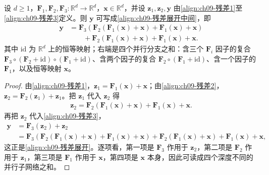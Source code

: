 \documentclass[../../main.tex]{subfiles}
\begin{document}
\begin{proposition}[残差网络的展开]\label{proposition:ch09-残差展开}
设 $d\geqslant1$，$\boldsymbol{F}_{1},\boldsymbol{F}_{2},\boldsymbol{F}_{3}:\mathbb{R}^{d}\to\mathbb{R}^{d}$，$\boldsymbol{x}\in\mathbb{R}^{d}$，并设 $\boldsymbol{z}_{1},\boldsymbol{z}_{2},\boldsymbol{y}$ 由\eqref{align:ch09-残差1}至\eqref{align:ch09-残差3}定义。则 $\boldsymbol{y}$ 可写成\eqref{align:ch09-残差展开中间}，即
\begin{align}
\boldsymbol{y}
&=\boldsymbol{F}_{3}\!\left(\boldsymbol{F}_{2}\!\left(\boldsymbol{F}_{1}(\boldsymbol{x})+\boldsymbol{x}\right)+\boldsymbol{F}_{1}(\boldsymbol{x})+\boldsymbol{x}\right)\nonumber\\
&\qquad+\boldsymbol{F}_{2}\!\left(\boldsymbol{F}_{1}(\boldsymbol{x})+\boldsymbol{x}\right)+\boldsymbol{F}_{1}(\boldsymbol{x})+\boldsymbol{x}.
\label{align:ch09-残差展开}
\end{align}
其中 $\mathrm{id}$ 为 $\mathbb{R}^{d}$ 上的恒等映射；右端是四个并行分支之和：含三个 $\boldsymbol{F}_{i}$ 因子的复合 $\boldsymbol{F}_{3}\circ(\boldsymbol{F}_{2}+\mathrm{id})\circ(\boldsymbol{F}_{1}+\mathrm{id})$、含两个因子的复合 $\boldsymbol{F}_{2}\circ(\boldsymbol{F}_{1}+\mathrm{id})$、含一个因子的 $\boldsymbol{F}_{1}$，以及恒等映射 $\boldsymbol{x}$。
\end{proposition}

\begin{proof}
由\eqref{align:ch09-残差1}，$\boldsymbol{z}_{1}=\boldsymbol{F}_{1}(\boldsymbol{x})+\boldsymbol{x}$；由\eqref{align:ch09-残差2}，$\boldsymbol{z}_{2}=\boldsymbol{F}_{2}(\boldsymbol{z}_{1})+\boldsymbol{z}_{1}$。把 $\boldsymbol{z}_{1}$ 代入 $\boldsymbol{z}_{2}$ 得
\begin{align*}
\boldsymbol{z}_{2}=\boldsymbol{F}_{2}\!\left(\boldsymbol{F}_{1}(\boldsymbol{x})+\boldsymbol{x}\right)+\boldsymbol{F}_{1}(\boldsymbol{x})+\boldsymbol{x}.
\end{align*}
再把 $\boldsymbol{z}_{2}$ 代入\eqref{align:ch09-残差3}，
\begin{align*}
\boldsymbol{y}&=\boldsymbol{F}_{3}(\boldsymbol{z}_{2})+\boldsymbol{z}_{2}\\
&=\boldsymbol{F}_{3}\!\left(\boldsymbol{F}_{2}\!\left(\boldsymbol{F}_{1}(\boldsymbol{x})+\boldsymbol{x}\right)+\boldsymbol{F}_{1}(\boldsymbol{x})+\boldsymbol{x}\right)+\boldsymbol{F}_{2}\!\left(\boldsymbol{F}_{1}(\boldsymbol{x})+\boldsymbol{x}\right)+\boldsymbol{F}_{1}(\boldsymbol{x})+\boldsymbol{x},
\end{align*}
这正是\eqref{align:ch09-残差展开}。逐项看，第一项是 $\boldsymbol{F}_{3}$ 作用于 $\boldsymbol{z}_{2}$，第二项是 $\boldsymbol{F}_{2}$ 作用于 $\boldsymbol{z}_{1}$，第三项是 $\boldsymbol{F}_{1}$ 作用于 $\boldsymbol{x}$，第四项是 $\boldsymbol{x}$ 本身，因此可读成四个深度不同的并行子网络之和。
\end{proof}
\end{document}

